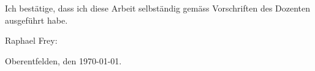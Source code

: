 Ich best\"atige, dass ich diese Arbeit selbst\"andig gem\"ass Vorschriften des
Dozenten ausgef\"uhrt habe.

\vspace*{3em}

Raphael Frey:  \underline{\hspace{8cm}}

\vspace*{3em}

Oberentfelden, den \today.

